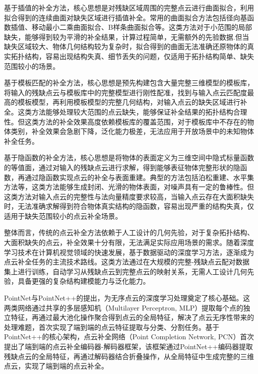 基于插值的补全方法，核心思想是对残缺区域周围的完整点云进行曲面拟合，利用拟合得到的连续曲面对缺失区域进行插值补全。常用的曲面拟合方法包括径向基函数插值、移动最小二乘曲面拟合、B样条曲面拟合等。这类方法对于小范围的局部缺失，能够得到较为平滑的补全结果，计算过程简单，无需额外的先验数据\cite{alexa2001point}.但当缺失区域较大、物体几何结构较为复杂时，拟合得到的曲面无法准确还原物体的真实拓扑结构，容易出现结构失真、细节丢失的问题，仅适用于拓扑结构简单、缺失范围较小的场景。

基于模板匹配的补全方法，核心思想是预先构建包含大量完整三维模型的模板库，将输入的残缺点云与模板库中的完整模型进行刚性配准，找到与输入点云匹配度最高的模板模型，再利用模板模型的完整几何结构，对输入点云的缺失区域进行补全。这类方法能够处理较大范围的点云缺失，能够保证补全结果的拓扑结构合理性\cite{pauly2005example}。但这类方法的补全效果高度依赖模板库的覆盖范围，对于模板库中不存在的物体类别，补全效果会急剧下降，泛化能力极差，无法应用于开放场景中的未知物体补全任务。

基于隐函数的补全方法，核心思想是将物体的表面定义为三维空间中隐式标量函数的等值面，通过对输入的残缺点云进行求解，得到能够表征物体完整形状的隐函数，再通过隐函数实现点云的补全与表面重建。典型的方法包括泊松重建、水平集方法等，这类方法能够生成封闭、光滑的物体表面，对噪声具有一定的鲁棒性\cite{kazhdan2013screened}。但这类方法对输入点云的完整性与法向量精度要求较高，当输入点云存在大面积缺失时，无法准确求解得到符合物体真实结构的隐函数，容易出现严重的结构失真，仅适用于缺失范围较小的点云补全场景\cite{yan2022shapeformer}。

整体而言，传统的点云补全方法依赖于人工设计的几何先验，对于复杂拓扑结构、大面积缺失的点云，补全效果十分有限，无法满足实际应用场景的需求。随着深度学习技术在计算机视觉领域的快速发展，基于数据驱动的深度学习方法，逐渐成为点云补全任务的主流技术路线。这类方法通过在大规模的完整-残缺点云配对数据集上进行训练，自动学习从残缺点云到完整点云的映射关系，无需人工设计几何先验，具备更强的复杂结构建模能力与泛化能力。

PointNet与PointNet++的提出，为无序点云的深度学习处理奠定了核心基础。这两类网络通过共享的多层感知机（Multilayer Perceptron, MLP）提取每个点的独立特征，再通过最大池化操作聚合得到点云的全局特征，解决了点云无序性带来的处理难题，首次实现了端到端的点云特征提取与分类、分割任务\cite{qi2017pointnet,qi2017pointnetplusplus}。基于PointNet++的核心架构，点云补全网络（Point Completion Network, PCN）首次提出了端到端的点云补全编码器-解码器框架，该框架通过PointNet++编码器提取残缺点云的全局特征，再通过解码器结合折叠操作，从全局特征中生成完整的三维点云，实现了端到端的点云补全\cite{fan2017pcn}。

